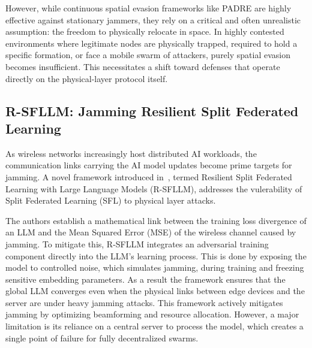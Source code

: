 \documentclass[journal]{IEEEtran}
\newcommand{\adm}[1]{{\color{orange}{[#1]}}}
\newcommand{\rar}[1]{{\color{blue}{[#1]}}}
\begin{document}
However, while continuous spatial evasion frameworks like PADRE are highly effective against stationary jammers, they rely on a critical and often unrealistic assumption: the freedom to physically relocate in space.
In highly contested environments where legitimate nodes are physically trapped, required to hold a specific formation, or face a mobile swarm of attackers, purely spatial evasion becomes insufficient.
This necessitates a shift toward defenses that operate directly on the physical-layer protocol itself.
\adm{yes, but we can also focus on phy-methods RW to keep it more relevant to your novel method's scope: it does not consider relocation but cooperative/synchronized PHY signal construction for max attack and max resiliency}
\rar{"it has strong assumptions than valianti (no phy tx power adaptation) but uses a more sophisticated rl model" -> maybe add this here somewhere}

\subsection{R-SFLLM: Jamming Resilient Split Federated Learning}
\rar{Before tackling these comments, decide whether its relevant for paper}
As wireless networks increasingly host distributed AI workloads, the communication links carrying the AI model updates become prime targets for jamming.
\adm{this is quite application-specific. we do not really mind what is carried by the application but rather focus on using AI-based methods to enhance system resiliency or attack impact}
A novel framework introduced in~\cite{djuhera2025r}, termed Resilient Split Federated Learning with Large Language Models (R-SFLLM), addresses the vulerability of Split Federated Learning (SFL) to physical layer attacks. 

The authors establish a mathematical link between the training loss divergence of an LLM and the Mean Squared Error (MSE) of the wireless channel caused by jamming.
\adm{the use case is a bit forced: app-layer problems and phy-layer problems can be disentangled and tackled separately}
To mitigate this, R-SFLLM integrates an adversarial training component directly into the LLM's learning process. 
This is done by exposing the model to controlled noise, which simulates jamming, during training and freezing sensitive embedding parameters. 
As a result the framework ensures that the global LLM converges \adm{i guess they are trying to train an LLM in a federated style? it is out of scope for this work} even when the physical links between edge devices and the server are under heavy jamming attacks.
\adm{this method focuses on an application. we want a method to mitigate jamming, not to propose a jamming-resilient application. it might be an interesting RQ but out of scope because we focus on jamming mitigation}
This framework actively mitigates jamming by optimizing beamforming and resource allocation. \adm{we can also use such guiding principles, but application-agnostic. i.e., LLM can be used as system optimizers and not as application (can be anything)}
However, a major limitation is its reliance on a central server to process the model, which creates a single point of failure for fully decentralized swarms.
\end{document}

